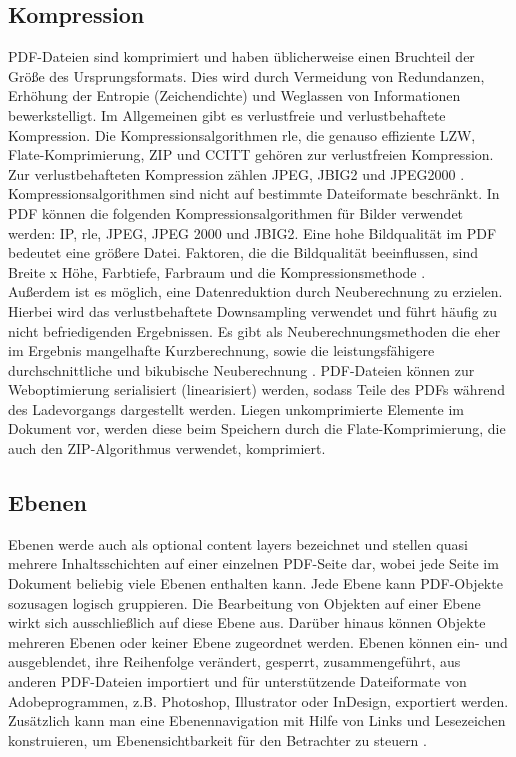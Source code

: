 \subsection{Kompression}
PDF-Dateien sind komprimiert und haben üblicherweise einen Bruchteil der Größe des Ursprungsformats. Dies wird durch Vermeidung von Redundanzen, Erhöhung der Entropie (Zeichendichte) und Weglassen von Informationen bewerkstelligt. Im Allgemeinen gibt es verlustfreie und verlustbehaftete Kompression. Die Kompressionsalgorithmen \gls{rle}, die genauso effiziente LZW, Flate-Komprimierung, ZIP und CCITT gehören zur verlustfreien Kompression. Zur verlustbehafteten Kompression zählen JPEG, JBIG2 und JPEG2000 \cite{schneeberger}. Kompressionsalgorithmen sind nicht auf bestimmte Dateiformate beschränkt. In PDF können die folgenden Kompressionsalgorithmen für Bilder verwendet werden: IP, \gls{rle}, JPEG, JPEG 2000 und JBIG2. Eine hohe Bildqualität im PDF bedeutet eine größere Datei. Faktoren, die die Bildqualität beeinflussen, sind Breite x Höhe, Farbtiefe, Farbraum und die Kompressionsmethode \cite{softx}. \\
Außerdem ist es möglich, eine Datenreduktion durch Neuberechnung zu erzielen. Hierbei wird das verlustbehaftete Downsampling verwendet und führt häufig zu nicht befriedigenden Ergebnissen. Es gibt als Neuberechnungsmethoden die eher im Ergebnis mangelhafte Kurzberechnung, sowie die leistungsfähigere durchschnittliche und bikubische Neuberechnung \cite{schneeberger}. PDF-Dateien können zur Weboptimierung serialisiert (linearisiert) werden, sodass Teile des PDFs während des Ladevorgangs dargestellt werden. Liegen unkomprimierte Elemente im Dokument vor, werden diese beim Speichern durch die Flate-Komprimierung, die auch den ZIP-Algorithmus verwendet, komprimiert.

\subsection{Ebenen}
Ebenen werde auch als optional content layers bezeichnet und stellen quasi mehrere Inhaltsschichten auf einer einzelnen PDF-Seite dar, wobei jede Seite im Dokument beliebig viele Ebenen enthalten kann. Jede Ebene kann PDF-Objekte sozusagen logisch gruppieren. Die Bearbeitung von Objekten auf einer Ebene wirkt sich ausschließlich auf diese Ebene aus. Darüber hinaus können Objekte mehreren Ebenen oder keiner Ebene zugeordnet werden. Ebenen können ein- und ausgeblendet, ihre Reihenfolge verändert, gesperrt, zusammengeführt, aus anderen PDF-Dateien importiert und für unterstützende Dateiformate von Adobeprogrammen, z.B. Photoshop, Illustrator oder InDesign, exportiert werden. Zusätzlich kann man eine Ebenennavigation mit Hilfe von Links und Lesezeichen konstruieren, um Ebenensichtbarkeit für den Betrachter zu steuern \cite{adobe-ebenen}. 

